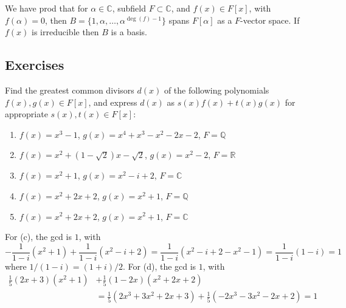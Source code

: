   We have prod that for $\alpha \in \mathbb{C}$, subfield $F \subset \mathbb{C}$, and $f(x) \in F[x]$, with $f(\alpha) = 0$, then $B = \{1, \alpha, \ldots, \alpha^{\deg(f) - 1}\}$ spans $F[\alpha]$ as a $F$-vector space. If $f(x)$ is irreducible then $B$ is a basis. 

\subsection{Exercises}

  \begin{exercise}[Shifrin 3.1.2.c/d]
    Find the greatest common divisors $d(x)$ of the following polynomials $f(x), g(x) \in F[x]$, and express $d(x)$ as $s(x)f(x) + t(x)g(x)$ for appropriate $s(x), t(x) \in F[x]$:
    \begin{enumerate}
      \item $f(x) = x^3 - 1$, $g(x) = x^4 + x^3 - x^2 - 2x - 2$, $F = \mathbb{Q}$
      \item $f(x) = x^2 + (1 - \sqrt{2})x - \sqrt{2}$, $g(x) = x^2 - 2$, $F = \mathbb{R}$
      \item $f(x) = x^2 + 1$, $g(x) = x^2 - i + 2$, $F = \mathbb{C}$
      \item $f(x) = x^2 + 2x + 2$, $g(x) = x^2 + 1$, $F = \mathbb{Q}$
      \item $f(x) = x^2 + 2x + 2$, $g(x) = x^2 + 1$, $F = \mathbb{C}$
    \end{enumerate}
  \end{exercise}
  \begin{solution}
    For (c), the gcd is $1$, with 
    \begin{equation} 
      -\frac{1}{1 - i} (x^2 + 1) + \frac{1}{1 - i} (x^2 - i + 2) = \frac{1}{1-i} (x^2 - i + 2 - x^2 - 1) = \frac{1}{1-i} (1 - i) = 1
    \end{equation}
    where $1/(1-i) = (1 + i)/2$. For (d), the gcd is $1$, with 
    \begin{align}
      \frac{1}{5} (2x + 3) (x^2 + 1) & + \frac{1}{5} (1 - 2x) (x^2 + 2x + 2) \\
                                          & = \frac{1}{5} (2x^3 + 3x^2 + 2x + 3) + \frac{1}{5} (-2x^3 - 3x^2 - 2x + 2) = 1
    \end{align}
  \end{solution}

